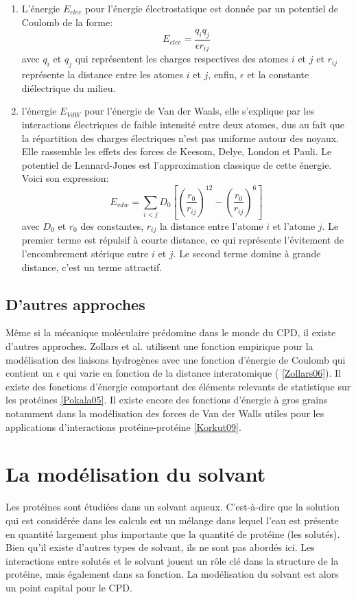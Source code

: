 \begin{enumerate}
  \label{VdW}
\item L'énergie $E_{elec}$ pour l'énergie électrostatique est donnée par un potentiel de Coulomb de la forme:
  \begin{equation}
    E_{elec}=\frac{q_iq_j}{\epsilon r_{ij}}
  \end{equation}
  avec $q_i$ et $q_j$ qui représentent les charges respectives des atomes $i$ et $j$ et $r_{ij}$ représente la distance entre les atomes $i$ et $j$, enfin, $\epsilon$ et la constante diélectrique du milieu.
\item l'énergie  $E_{VdW}$ pour l'énergie de Van der Waals, elle s'explique par les interactions électriques de faible intensité entre deux atomes, dus au fait que la répartition des charges électriques n'est pas uniforme autour des noyaux. Elle rassemble les effets des forces de Keesom, Delye, London et Pauli. Le potentiel de Lennard-Jones est l'approximation classique de cette énergie. Voici son expression:
  \begin{equation}
  E_{vdw} = \sum_{i<j}D_0 [(\frac{r_0}{r_{ij}})^12 - (\frac{r_0}{r_{ij}})^6]  
  \end{equation}
avec $D_0$ et $r_0$ des constantes, $r_{ij}$ la distance entre l'atome $i$ et l'atome $j$. Le premier terme est répulsif à courte distance, ce qui représente l'évitement de l'encombrement stérique entre $i$ et $j$. Le second terme domine à grande distance, c'est un terme attractif. 
  
\end{enumerate}


\subsection{D'autres approches}

Même si la mécanique moléculaire prédomine dans le monde du CPD, il existe d'autres approches. Zollars et al. utilisent une fonction empirique pour la modélisation des liaisons hydrogènes avec une fonction d'énergie de Coulomb qui contient un $\epsilon$ qui varie en fonction de la distance interatomique ( \ref{Zollars06}). Il existe des fonctions d'énergie comportant des éléments relevants de statistique sur les protéines \ref{Pokala05}. Il existe encore des fonctions d'énergie à gros grains notamment dans la modélisation des forces de Van der Walls utiles pour les applications d'interactions protéine-protéine \ref{Korkut09}.

\section{La modélisation du solvant}
Les protéines sont étudiées dans un solvant aqueux. C'est-à-dire que la solution qui est considérée dans les calculs est un mélange dans lequel l'eau est présente en quantité largement plus importante que la quantité de protéine (les solutés). Bien qu'il existe d'autres types de solvant, ils ne sont pas abordés ici. Les interactions entre solutés et le solvant jouent un rôle clé dans la structure de la protéine, mais également dans sa fonction. La modélisation du solvant est alors un point capital pour le CPD.

